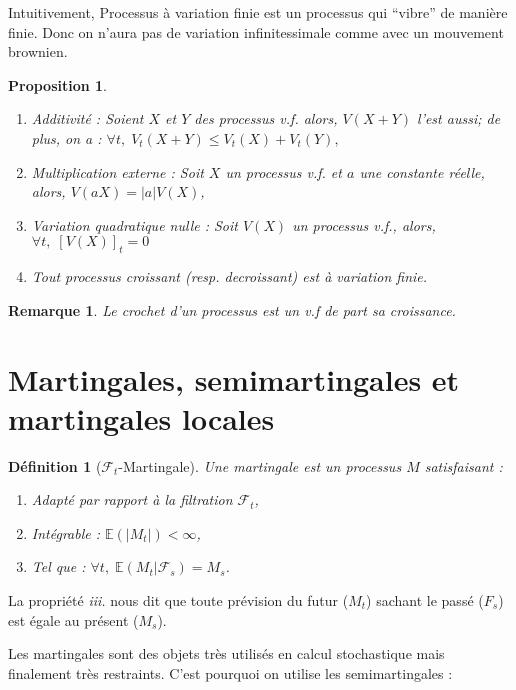 \documentclass[openany]{book}
\newcommand{\F}{\mathscr{F}}
\newcommand{\E}{\mathbb{E}}
\theoremstyle{thmfont}
\theoremstyle{deffont}
\newtheorem{definition}[definition]{Définition}
\theoremstyle{thmfont}
\newtheorem{prop}[prop]{Proposition}
\theoremstyle{deffont}
\newtheorem*{remark}{Remarque}
\begin{document}
Intuitivement, Processus à variation finie est un processus qui ``vibre'' de manière finie. Donc on n'aura pas de variation infinitessimale comme avec un mouvement brownien.

\begin{prop}
  \begin{enumerate}[nosep]
  \item Additivité : Soient $X$ et $Y$ des processus v.f. alors, $V(X+Y)$ l'est aussi; de plus, on a : $\forall t, \; V_t(X+Y) \leq V_t(X)+V_t(Y),$
  \item Multiplication externe : Soit $X$ un processus v.f. et $a$ une constante réelle, alors, $V(aX) = |a| V(X)$,
  \item Variation quadratique nulle : Soit $V(X)$ un processus v.f., alors,\\ $\forall t,\; [V(X)]_t=0$
  \item Tout processus croissant (resp. decroissant) est à variation finie.
  \end{enumerate}
\end{prop}

\begin{remark}
  Le crochet d'un processus est un v.f de part sa croissance.
\end{remark}

\section{Martingales, semimartingales et martingales locales}

\begin{definition}[$\F_t$-Martingale]
  Une \textit{martingale} est un processus $M$ satisfaisant :
  \begin{enumerate}[nosep]
    \item Adapté par rapport à la filtration $\F_t$,
    \item Intégrable : $\E(|M_t|) < \infty$,
    \item Tel que : $\forall t, \; \E(M_t|\F_s) = M_s$.
  \end{enumerate}
\end{definition}

La propriété \textit{iii.} nous dit que toute prévision du futur ($M_t$) sachant le passé ($F_s$) est égale au présent ($M_s$).

Les martingales sont des objets très utilisés en calcul stochastique mais finalement très restraints. C'est pourquoi on utilise les semimartingales :
\end{document}
